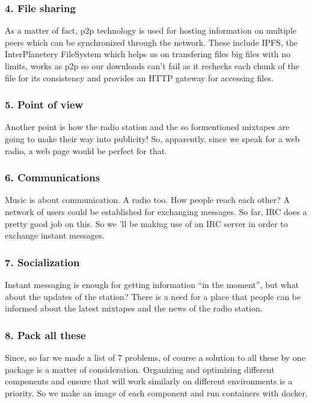 \documentclass[12pt]{report}
\begin{document}
\subsubsection{4. File sharing}\label{file-sharing}

As a matter of fact, p2p technology is used for hosting information on
multiple peers which can be synchronized through the network. These
include IPFS, the InterPlanetery FileSystem which helps us on
transfering files big files with no limits, works as p2p so our
downloads can't fail as it rechecks each chunk of the file for its
consistency and provides an HTTP gateway for accessing files.


\subsubsection{5. Point of view}\label{point-of-view}

Another point is how the radio station and the so formentioned mixtapes
are going to make their way into publicity! So, apparently, since we
speak for a web radio, a web page would be perfect for that.


\subsubsection{6. Communications}\label{communications}

Music is about communication. A radio too. How people reach each other?
A network of users could be established for exchanging messages. So far,
IRC does a pretty good job on this. So we 'll be making use of an IRC
server in order to exchange instant messages.


\subsubsection{7. Socialization}\label{socialization}

Instant messaging is enough for getting information ``in the moment'',
but what about the updates of the station? There is a need for a place
that people can be informed about the latest mixtapes and the news of
the radio station.


\subsubsection{8. Pack all these}\label{pack-all-these}

Since, so far we made a list of 7 problems, of course a solution to all
these by one package is a matter of consideration. Organizing and
optimizing different components and ensure that will work similarly on
different environments is a priority. So we make an image of each
component and run containers with docker.
\end{document}
